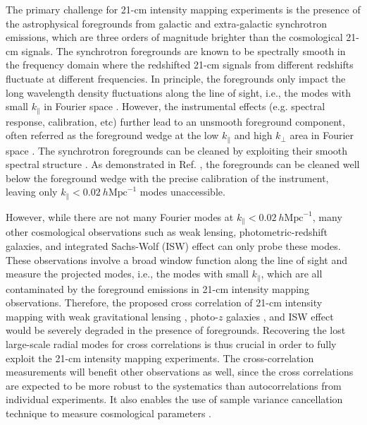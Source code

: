 \documentclass[prd,superscriptaddress,floatfix,notitlepage,nofootinbib,reprint]{revtex4-1}
\newcommand{\mr}{\mathrm}
\newcommand{\kpa}{k_\parallel}
\newcommand{\kpe}{k_\perp}
\begin{document}
The primary challenge for 21-cm intensity mapping experiments is the presence
of the astrophysical foregrounds from galactic and extra-galactic synchrotron 
emissions, which are three orders of magnitude brighter than the cosmological
21-cm signals. 
The synchrotron foregrounds are known to be spectrally smooth in the frequency
domain where the redshifted 21-cm signals from different redshifts fluctuate at 
different frequencies.
In principle, the foregrounds only impact the long wavelength density 
fluctuations along the line of sight, i.e., the modes with small $\kpa$ in 
Fourier space \cite{2003FG,2006FG}. 
However, the instrumental effects (e.g. spectral response, calibration, etc) 
further lead to an unsmooth foreground component, often referred as the 
foreground wedge at the low $\kpa$ and high $\kpe$ area in Fourier space 
\cite{2010Wedge,2012Wedge,2012Wedge2,2013Wedge,2015Wedge}.
The synchrotron foregrounds can be cleaned by exploiting their smooth spectral 
structure \cite{2011FG,2012FG,2014FG,2015FG}.
As demonstrated in Ref. \cite{2015FG}, the foregrounds can be cleaned well 
below the foreground wedge with the precise calibration of the instrument, 
leaving only $\kpa<0.02\ h\mr{Mpc}^{-1}$ modes unaccessible.

However, while there are not many Fourier modes at $\kpa<0.02\ h\mr{Mpc}^{-1}$, 
many other cosmological observations such as weak lensing, photometric-redshift
galaxies, and integrated Sachs-Wolf (ISW) effect can only probe these modes.
These observations involve a broad window function along the line of sight and
measure the projected modes, i.e., the modes with small $\kpa$, which are all
contaminated by the foreground emissions in 21-cm intensity mapping 
observations.
Therefore, the proposed cross correlation of 21-cm intensity mapping with weak
gravitational lensing \cite{2015xLensing&Photoz,2016xLensing,2016xLensing2}, 
photo-$z$ galaxies \cite{2015xLensing&Photoz,2015xPhotoz,2015xPhotoz2,2017xPhotoz,2017xPhotoz&ISW,2017xPhotoz2}, and ISW effect \cite{2017xPhotoz&ISW} would 
be severely degraded in the presence of foregrounds.
Recovering the lost large-scale radial modes for cross correlations is thus 
crucial in order to fully exploit the 21-cm intensity mapping experiments.
The cross-correlation measurements will benefit other observations as well,
since the cross correlations are expected to be more robust to the systematics
than autocorrelations from individual experiments. 
It also enables the use of sample variance cancellation technique \cite{2009MT}
to measure cosmological parameters \cite{2015xPhotoz,2015xPhotoz2,2017xPhotoz}.
\end{document}
